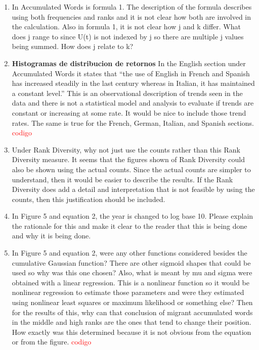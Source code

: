 \documentclass{article}
\begin{document}
\begin{enumerate}
\item  In Accumulated Words is formula 1. The description of the formula
describes using both frequencies and ranks and it is not clear how
both are involved in the calculation. Also in formula 1, it is not
clear how j and k differ. What does j range to since U(t) is not
indexed by j so there are multiple j values being summed. How does j
relate to k?

\item \textbf{Histogramas de distribucion de retornos }In the English section under Accumulated Words it states that “the
use of English in French and Spanish has increased steadily in the
last century whereas in Italian, it has maintained a constant level.”
This is an observational description of trends seen in the data and
there is not a statistical model and analysis to evaluate if trends
are constant or increasing at some rate. It would be nice to include
those trend rates. The same is true for the French, German, Italian,
and Spanish sections. \textcolor{red}{codigo}

\item Under Rank Diversity, why not just use the counts rather than this
Rank Diversity measure. It seems that the figures shown of Rank
Diversity could also be shown using the actual counts. Since the
actual counts are simpler to understand, then it would be easier to
describe the results. If the Rank Diversity does add a detail and
interpretation that is not feasible by using the counts, then this
justification should be included.

\item  In Figure 5 and equation 2, the year is changed to log base 10.
Please explain the rationale for this and make it clear to the reader
that this is being done and why it is being done.

\item  In Figure 5 and equation 2, were any other functions considered
besides the cumulative Gaussian function? There are other sigmoid
shapes that could be used so why was this one chosen? Also, what is
meant by mu and sigma were obtained with a linear regression. This is
a nonlinear function so it would be nonlinear regression to estimate
those parameters and were they estimated using nonlinear least squares
or maximum likelihood or something else? Then for the results of this,
why can that conclusion of migrant accumulated words in the middle and
high ranks are the ones that tend to change their position. How
exactly was this determined because it is not obvious from the
equation or from the figure. \textcolor{red}{codigo}


\end{enumerate}
\end{document}
